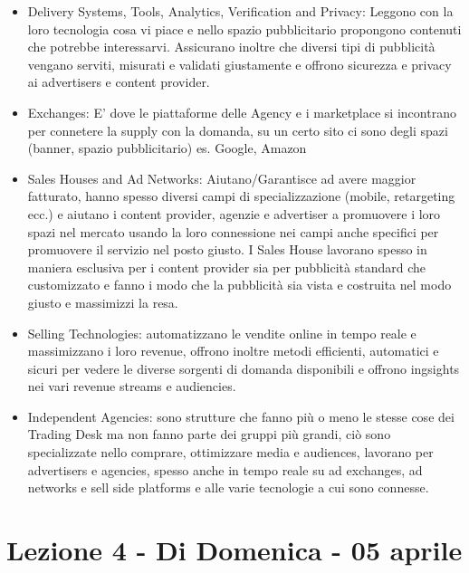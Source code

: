 \documentclass[11pt]{article}
\begin{document}
\begin{itemize}
	\item Delivery Systems, Tools, Analytics, Verification and Privacy: Leggono con la loro tecnologia cosa vi piace e nello spazio pubblicitario propongono contenuti che potrebbe interessarvi. Assicurano inoltre che diversi tipi di pubblicità vengano serviti, misurati e validati giustamente e offrono sicurezza e privacy ai advertisers e content provider.
	\item Exchanges: E' dove le piattaforme delle Agency e i marketplace si incontrano per connetere la supply con la domanda, su un certo sito ci sono degli spazi (banner, spazio pubblicitario) es. Google, Amazon
	\item Sales Houses and Ad Networks: Aiutano/Garantisce ad avere maggior fatturato, hanno spesso diversi campi di specializzazione (mobile, retargeting ecc.) e aiutano i content provider, agenzie e advertiser a promuovere i loro spazi nel mercato usando la loro connessione nei campi anche specifici per promuovere il servizio nel posto giusto. I Sales House lavorano spesso in maniera esclusiva per i content provider sia per pubblicità standard che customizzato e fanno i modo che la pubblicità sia vista e costruita nel modo giusto e massimizzi la resa.
	\item Selling Technologies: automatizzano le vendite online in tempo reale e massimizzano i loro revenue, offrono inoltre metodi efficienti, automatici e sicuri per vedere le diverse sorgenti di domanda disponibili e offrono ingsights nei vari revenue streams e audiencies.
	\item Independent Agencies: sono strutture che fanno più o meno le stesse cose dei Trading Desk ma non fanno parte dei gruppi più grandi, ciò sono specializzate nello comprare, ottimizzare media e audiences, lavorano per advertisers e agencies, spesso anche in tempo reale su ad exchanges, ad networks e sell side platforms e alle varie tecnologie a cui sono connesse.
\end{itemize}

\section{Lezione 4 - Di Domenica - 05 aprile}
\end{document}
